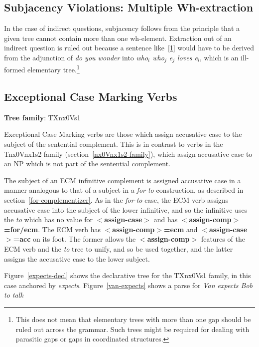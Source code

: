 \subsection{Subjacency Violations: Multiple Wh-extraction}

In the case of indirect questions, subjacency follows from the principle that a
given tree cannot contain more than one wh-element. Extraction out of an
indirect question is ruled out because a sentence like~\ref{1} would have to be
derived from the adjunction of {\it do you wonder} into {\it who$_{i}$
who$_{j}$ e$_{j}$ loves e$_{i}$}, which is an ill-formed elementary
tree.\footnote{This does not mean that elementary trees with more than one gap
should be ruled out across the grammar. Such trees might be required for
dealing with parasitic gaps or gaps in coordinated structures.}




\subsection{Exceptional Case Marking Verbs}
\label{ecm-verbs}

{\bf Tree family}: TXnx0Vs1

Exceptional Case Marking verbs are those which assign accusative case to the
subject of the sentential complement. This is in contrast to verbs
in the Tnx0Vnx1s2 family (section~\ref{nx0Vnx1s2-family}), which assign 
accusative case to an NP which is not part of the sentential complement.  

The subject of an ECM infinitive complement is assigned accusative case in a
manner analogous to that of a subject in a {\it for-to\/} construction, as
described in section~\ref{for-complementizer}.  As in the {\it for-to\/} case,
the ECM verb assigns accusative case into the subject of the lower infinitive,
and so the infinitive uses the {\it to} which has no value for {\bf
$<$assign-case$>$} and has {\bf $<$assign-comp$>$=for/ecm}.  The ECM verb has
{\bf $<$assign-comp$>$=ecm} and {\bf $<$assign-case$>$=acc} on its foot.  The
former allows the {\bf $<$assign-comp$>$} features of the ECM verb and the {\it
to} tree to unify, and so be used together, and the latter assigns the
accusative case to the lower subject.

Figure~\ref{expects-decl} shows the declarative tree for the TXnx0Vs1 family,
in this case anchored by {\it expects}.  Figure~\ref{van-expects} shows a parse
for {\it Van expects Bob to talk}

